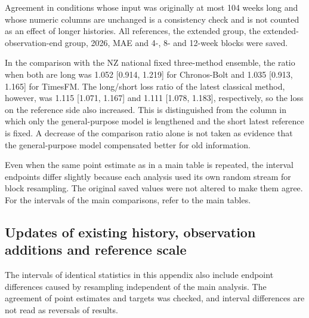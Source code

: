 \documentclass[11pt]{article}
\newcommand{\gentable}[1]{\adjustbox{max width=\linewidth}{}}
\begin{document}
\begin{table}[H]\centering\small
\caption{History length of at most 104 versus at most 256 weeks (exploratory). WIS ratios relative to the latest fixed three-method ensemble.}\label{tab:history}
\gentable{tab_history}
\end{table}

\begin{table}[H]\centering\small
\caption{Changes of the losses of the candidate and of the latest classical reference on the same targets when the history is extended (exploratory). Cases whose histories were not extended are included in the denominator, so the number of extended cases is shown in Table~\ref{tab:history}.}\label{tab:historylosses}
\gentable{tab_history_losses}
\end{table}

Agreement in conditions whose input was originally at most 104 weeks long and whose numeric columns are unchanged is a consistency check and is not counted as an effect of longer histories. All references, the extended group, the extended-observation-end group, 2026, MAE and 4-, 8- and 12-week blocks were saved.

In the comparison with the NZ national fixed three-method ensemble, the ratio when both are long was 1.052 [0.914, 1.219] for Chronos-Bolt and 1.035 [0.913, 1.165] for TimesFM. The long/short loss ratio of the latest classical method, however, was 1.115 [1.071, 1.167] and 1.111 [1.078, 1.183], respectively, so the loss on the reference side also increased. This is distinguished from the column in which only the general-purpose model is lengthened and the short latest reference is fixed. A decrease of the comparison ratio alone is not taken as evidence that the general-purpose model compensated better for old information.

Even when the same point estimate as in a main table is repeated, the interval endpoints differ slightly because each analysis used its own random stream for block resampling. The original saved values were not altered to make them agree. For the intervals of the main comparisons, refer to the main tables.

\subsection{Updates of existing history, observation additions and reference scale}\label{app:updates}

The intervals of identical statistics in this appendix also include endpoint differences caused by resampling independent of the main analysis. The agreement of point estimates and targets was checked, and interval differences are not read as reversals of results.
\end{document}
